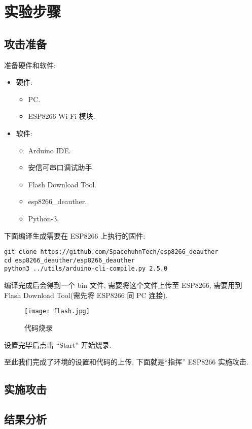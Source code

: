 \documentclass[../main.tex]{subfiles}
\begin{document}
\section{实验步骤}
\subsection{攻击准备}
准备硬件和软件:
\begin{itemize}
  \item 硬件:
    \begin{itemize}
      \item PC.
      \item ESP8266 Wi-Fi 模块.
    \end{itemize}
  \item 软件:
    \begin{itemize}
      \item Arduino IDE.
      \item 安信可串口调试助手.
      \item Flash Download Tool.
      \item esp8266\_deauther.
      \item Python-3.
    \end{itemize}
\end{itemize}

下面编译生成需要在 ESP8266 上执行的固件:
\begin{verbatim}
git clone https://github.com/SpacehuhnTech/esp8266_deauther
cd esp8266_deauther/esp8266_deauther
python3 ../utils/arduino-cli-compile.py 2.5.0
\end{verbatim}

编译完成后会得到一个 bin 文件, 需要将这个文件上传至 ESP8266, 需要用到 Flash
Download Tool(需先将 ESP8266 同 PC 连接).

\begin{figure}[H]
  \begin{center}
    \texttt{[image: flash.jpg]}
  \end{center}
  \caption{代码烧录}
\end{figure}

设置完毕后点击 ``Start'' 开始烧录.

至此我们完成了环境的设置和代码的上传, 下面就是``指挥'' ESP8266 实施攻击.
%
\subsection{实施攻击}
\subsection{结果分析}
\end{document}
